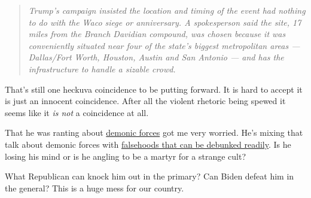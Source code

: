\begin{quote}
\emph{Trump's campaign insisted the location and timing of the event had
nothing to do with the Waco siege or anniversary. A spokesperson said
the site, 17 miles from the Branch Davidian compound, was chosen because
it was conveniently situated near four of the state's biggest
metropolitan areas --- Dallas/Fort Worth, Houston, Austin and San
Antonio --- and has the infrastructure to handle a sizable crowd.}
\end{quote}

That's still one heckuva coincidence to be putting forward. It is hard
to accept it is just an innocent coincidence. After all the violent
rhetoric being spewed it seems like it \emph{is not} a coincidence at
all.

That he was ranting about
\href{https://www.thedailybeast.com/trump-vows-to-defeat-demonic-forces-by-relentlessly-whining}{demonic
forces} got me very worried. He's mixing that talk about demonic forces
with
\href{https://www.cnn.com/2023/03/25/politics/trump-fact-check-waco-rally/index.html}{falsehoods
that can be debunked readily}. Is he losing his mind or is he angling to
be a martyr for a strange cult?

What Republican can knock him out in the primary? Can Biden defeat him
in the general? This is a huge mess for our country.
